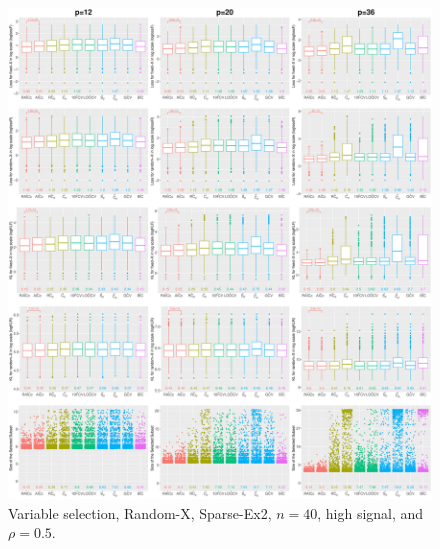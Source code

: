 \begin{figure}[!ht]
\centering
\includegraphics[width=\textwidth]{figures/supplement/randomx/subset_selection/Sparse-Ex2_n40_hsnr_rho05.eps}
\caption{Variable selection, Random-X, Sparse-Ex2, $n=40$, high signal, and $\rho=0.5$.}
\end{figure}
\clearpage
